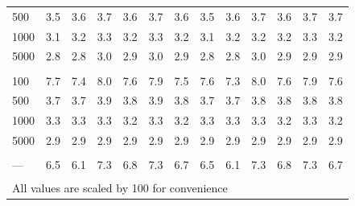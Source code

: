\documentclass[AMA,STIX1COL,doublespace]{WileyNJD-v2}
\begin{document}
\begin{table}
\begin{tabular}[t]{lcccccccccccc}
\hspace{1em}500 & 3.5 & 3.6 & 3.7 & 3.6 & 3.7 & 3.6 & 3.5 & 3.6 & 3.7 & 3.6 & 3.7 & 3.7\\
\hspace{1em}1000 & 3.1 & 3.2 & 3.3 & 3.2 & 3.3 & 3.2 & 3.1 & 3.2 & 3.2 & 3.2 & 3.3 & 3.2\\
\hspace{1em}5000 & 2.8 & 2.8 & 3.0 & 2.9 & 3.0 & 2.9 & 2.8 & 2.8 & 3.0 & 2.9 & 2.9 & 2.9\\
\addlinespace[0.75em]
\multicolumn{13}{l}{\textbf{10 predictors, 490 junk}}\\
\hline
\hspace{1em}100 & 7.7 & 7.4 & 8.0 & 7.6 & 7.9 & 7.5 & 7.6 & 7.3 & 8.0 & 7.6 & 7.9 & 7.6\\
\hspace{1em}500 & 3.7 & 3.7 & 3.9 & 3.8 & 3.9 & 3.8 & 3.7 & 3.7 & 3.8 & 3.8 & 3.8 & 3.8\\
\hspace{1em}1000 & 3.3 & 3.3 & 3.3 & 3.2 & 3.3 & 3.2 & 3.3 & 3.3 & 3.3 & 3.2 & 3.3 & 3.2\\
\hspace{1em}5000 & 2.9 & 2.9 & 2.9 & 2.9 & 2.9 & 2.9 & 2.9 & 2.9 & 2.9 & 2.9 & 2.9 & 2.9\\
\addlinespace[0.75em]
\multicolumn{13}{l}{\textbf{Overall}}\\
\hline
\hspace{1em}--- & 6.5 & 6.1 & 7.3 & 6.8 & 7.3 & 6.7 & 6.5 & 6.1 & 7.3 & 6.8 & 7.3 & 6.7\\
\bottomrule
\multicolumn{13}{l}{\textsuperscript{} All values are scaled by 100 for convenience}\\
\end{tabular}
\end{table}
\end{document}
